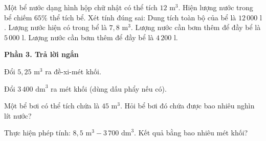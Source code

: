 \begin{ex} %
Một bể nước dạng hình hộp chữ nhật có thể tích $12\text{ m}^3$. Hiện lượng nước trong bể chiếm $65\%$ thể tích bể. Xét tính đúng sai:
\choiceTF
{\True Dung tích toàn bộ của bể là $12\,000\text{ l}$.}
{\True Lượng nước hiện có trong bể là $7{,}8\text{ m}^3$.}
{Lượng nước cần bơm thêm để đầy bể là $5\,000\text{ l}$.}
{\True Lượng nước cần bơm thêm để đầy bể là $4\,200\text{ l}$.}
\end{ex}

\textbf{Phần 3. Trả lời ngắn}

\begin{ex} %
Đổi $5{,}25\text{ m}^3$ ra đề-xi-mét khối.
\end{ex}

\begin{ex} %
Đổi $3\,400\text{ dm}^3$ ra mét khối (dùng dấu phẩy nếu có).
\end{ex}

\begin{ex} %
Một bể bơi có thể tích chứa là $45\text{ m}^3$. Hỏi bể bơi đó chứa được bao nhiêu nghìn lít nước?
\end{ex}

\begin{ex} %
Thực hiện phép tính: $8{,}5\text{ m}^3 - 3\,700\text{ dm}^3$. Kết quả bằng bao nhiêu mét khối?
\end{ex}

